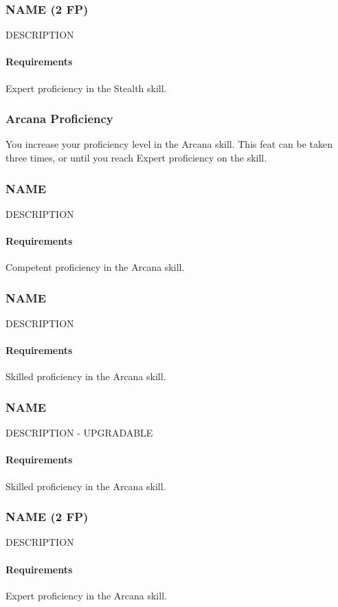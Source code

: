 \subsubsection{NAME (2 FP)} \label{feat::name}
    DESCRIPTION
    \paragraph{Requirements} Expert proficiency in the Stealth skill.
\subsubsection{Arcana Proficiency} \label{feat::arcanaprof}
    You increase your proficiency level in the Arcana skill.
    This feat can be taken three times, or until you reach Expert proficiency on the skill.
\subsubsection{NAME} \label{feat::name}
    DESCRIPTION
    \paragraph{Requirements} Competent proficiency in the Arcana skill.
\subsubsection{NAME} \label{feat::name}
    DESCRIPTION
    \paragraph{Requirements} Skilled proficiency in the Arcana skill.
\subsubsection{NAME} \label{feat::name}
    DESCRIPTION - UPGRADABLE
    \paragraph{Requirements} Skilled proficiency in the Arcana skill.
\subsubsection{NAME (2 FP)} \label{feat::name}
    DESCRIPTION
    \paragraph{Requirements} Expert proficiency in the Arcana skill.
